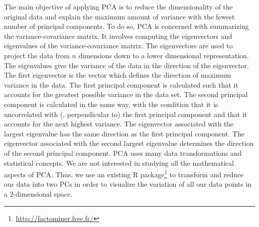 The main objective of applying PCA is to reduce the dimensionality of the original data and explain the maximum amount of variance with the fewest number of principal components. To do so, PCA is concerned with summarizing the variance-covariance matrix. It involves computing the eigenvectors and eigenvalues of the variance-covariance matrix. The eigenvectors are used to project the data from $n$ dimensions down to a lower dimensional representation. The eigenvalues give the variance of the data in the direction of the eigenvector. The first eigenvector is the vector which defines the direction of maximum variance in the data.
The first principal component is calculated such that it accounts for the greatest possible variance in the data set. The second principal component is calculated in the same way, with the condition that it is uncorrelated with (\ie, perpendicular to) the first principal component and that it accounts for the next highest variance. The eigenvector associated with the largest eigenvalue has the same direction as the first principal component. The eigenvector associated with the second largest eigenvalue determines the direction of the second principal component.
PCA uses many data transformations and statistical concepts. We are not interested in studying all the mathematical aspects of PCA. Thus, we use an existing R package\footnote{\url{http://factominer.free.fr/}} to transform and reduce our data into two PCs in order to visualize the variation of all our data points in a 2-dimensional space.

